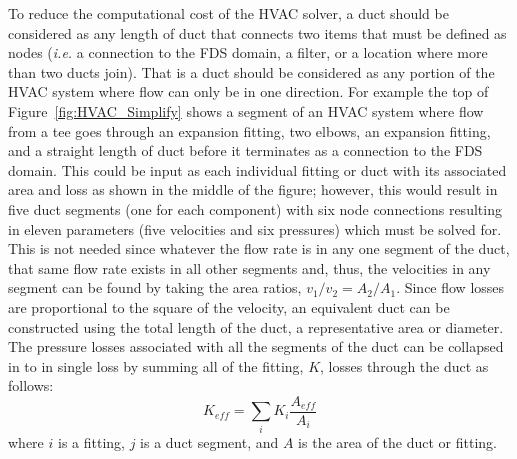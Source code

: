 \documentclass[11pt]{book}
\newcommand{\be}{\begin{equation}}
\newcommand{\ee}{\end{equation}}
\begin{document}
To reduce the computational cost of the HVAC solver, a duct should be considered as any length of duct that connects two items that must be defined as nodes ({\em i.e.} a connection to the FDS domain, a filter, or a location where more than two ducts join).  That is a duct should be considered as any portion of the HVAC system where flow can only be in one direction.  For example the top of Figure~\ref{fig:HVAC_Simplify} shows a segment of an HVAC system where flow from a tee goes through an expansion fitting, two elbows, an expansion fitting, and a straight length of duct before it terminates as a connection to the FDS domain.  This could be input as each individual fitting or duct with its associated area and loss as shown in the middle of the figure; however, this would result in five duct segments (one for each component) with six node connections resulting in eleven parameters (five velocities and six pressures) which must be solved for.  This is not needed since whatever the flow rate is in any one segment of the duct, that same flow rate exists in all other segments and, thus, the velocities in any segment can be found by taking the area ratios, $v_1/v_2=A_2/A_1$.  Since flow losses are proportional to the square of the velocity, an equivalent duct can be constructed using the total length of the duct, a representative area or diameter.  The pressure losses associated with all the segments of the duct can be collapsed in to in single loss by summing all of the fitting, $K$, losses through the duct as follows:
\be K_{eff} = \sum_i {K_i \frac {A_{eff}}{A_i}} \ee
where $i$ is a fitting, $j$ is a duct segment, and $A$ is the area of the duct or fitting.
\end{document}
